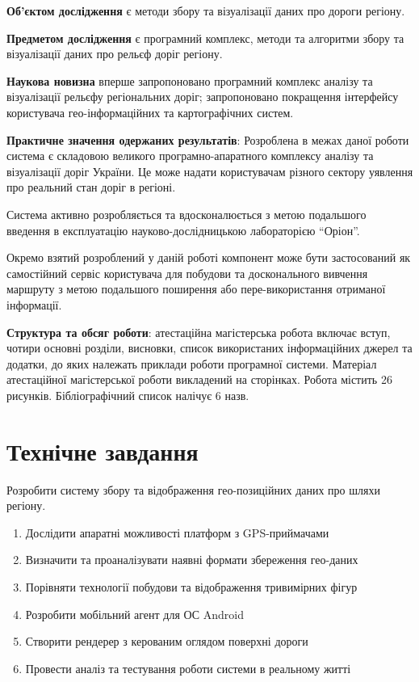 \documentclass[simple,a4paper,14pt,ukrainian,utf8]{eskdtext}
\begin{document}
	\textbf{Об’єктом дослідження} є методи збору та візуалізації даних про дороги регіону.

	\textbf{Предметом дослідження} є програмний комплекс, методи та алгоритми збору та візуалізації даних про рельєф доріг регіону.

	\textbf{Наукова новизна} вперше запропоновано програмний комплекс аналізу та візуалізації рельєфу регіональних доріг; запропоновано покращення інтерфейсу користувача гео-інформаційних та картографічних систем.

	\textbf{Практичне значення одержаних результатів}: Розроблена в межах даної роботи система є складовою великого програмно-апаратного комплексу аналізу та візуалізації доріг України. Це може надати користувачам різного сектору уявлення про реальний стан доріг в регіоні.
	
	Система активно розробляється та вдосконалюється з метою подальшого введення в експлуатацію науково-дослідницькою лабораторією “Оріон”. 

	Окремо взятий розроблений у даній роботі компонент може бути застосований як самостійний сервіс користувача для побудови та досконального вивчення маршруту з метою подальшого поширення або пере-використання отриманої інформації.

	\textbf{Структура та обсяг роботи}: атестаційна магістерська робота включає вступ, чотири основні розділи, висновки, список використаних інформаційних джерел та додатки, до яких належать приклади роботи програмної системи. Матеріал атестаційної магістерської роботи викладений на \pageref{LastPage} сторінках. Робота містить 26 рисунків. Бібліографічний список налічує 6 назв.

\clearpage \newpage \section{Технічне завдання}

    Розробити систему збору та відображення гео-позиційних даних про шляхи регіону.

    \begin{enumerate}
        \item Дослідити апаратні можливості платформ з GPS-приймачами
        \item Визначити та проаналізувати наявні формати збереження гео-даних
        \item Порівняти технології побудови та відображення тривимірних фігур
        \item Розробити мобільний агент для ОС Android
        \item Створити рендерер з керованим оглядом поверхні дороги
        \item Провести аналіз та тестування роботи системи в реальному житті
    \end{enumerate}
\end{document}
